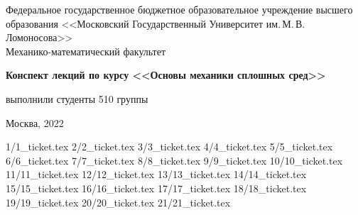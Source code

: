 \documentclass[specialist, subf, href, colorlinks=true, 12pt, times, mtpro, final]{disser}
\theoremstyle{definition}
\begin{document}
\begin{titlepage}
	\begin{center}
		
		Федеральное государственное бюджетное образовательное учреждение высшего образования 
		<<Московский Государственный Университет им.\,М.\,В.\,Ломоносова>>\\
		
		\vspace{9cm}
		Механико-математический факультет
		
		{\bf Конспект лекций по курсу <<Основы механики сплошных сред>>}
		
		\vspace{9cm}
		\begin{flushright}
			{ выполнили студенты 510 группы}\\
		\end{flushright}
		\vspace{1cm}
		
		\normalsize Москва, 2022
	\end{center}
\end{titlepage}

	
\tableofcontents
	
 {1/1_ticket.tex}
 {2/2_ticket.tex}
 {3/3_ticket.tex}
 {4/4_ticket.tex}
 {5/5_ticket.tex}
 {6/6_ticket.tex}
 {7/7_ticket.tex}
 {8/8_ticket.tex}
 {9/9_ticket.tex}
 {10/10_ticket.tex}
 {11/11_ticket.tex}
 {12/12_ticket.tex}
 {13/13_ticket.tex}
 {14/14_ticket.tex}
 {15/15_ticket.tex}
 {16/16_ticket.tex}
 {17/17_ticket.tex}
 {18/18_ticket.tex}
 {19/19_ticket.tex}
 {20/20_ticket.tex}
 {21/21_ticket.tex}

\newpage
\begin{thebibliography}{100}
	
\end{thebibliography}
\end{document}
